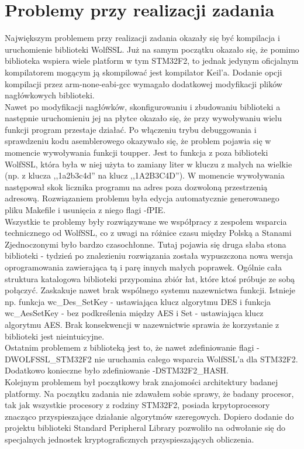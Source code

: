 \documentclass[oneside]{mgr}
\begin{document}
\chapter{Problemy przy realizacji zadania}

Największym problemem przy realizacji zadania okazały się być kompilacja i uruchomienie biblioteki WolfSSL. Już na samym początku okazało się, że pomimo biblioteka wspiera wiele platform w tym STM32F2, to jednak jedynym oficjalnym kompilatorem mogącym ją skompilować jest kompilator Keil'a. Dodanie opcji kompilacji przez arm-none-eabi-gcc wymagało dodatkowej modyfikacji plików nagłówkowych  biblioteki.\\Nawet po modyfikacji nagłówków, skonfigurowaniu i zbudowaniu biblioteki a następnie uruchomieniu jej na płytce okazało się, że przy wywoływaniu wielu funkcji program przestaje działać. Po włączeniu trybu debuggowania i sprawdzeniu kodu asemblerowego okazywało się, że problem pojawia się w momencie wywoływania funkcji toupper. Jest to funkcja z poza biblioteki WolfSSL, która była w niej użyta to zamiany liter w kluczu z małych na wielkie (np. z klucza ,,1a2b3c4d'' na klucz ,,1A2B3C4D''). W momencie wywoływania następował skok licznika programu na adres poza dozwoloną przestrzenią adresową. Rozwiązaniem problemu była edycja automatycznie generowanego pliku Makefile i usunięcia z niego flagi -fPIE.\\
Wszystkie te problemy były rozwiązywane we współpracy z zespołem wsparcia technicznego od WolfSSL, co z uwagi na różnice czasu między Polską a Stanami Zjednoczonymi było bardzo czasochłonne. Tutaj pojawia się druga słaba stona biblioteki - tydzień po znalezieniu rozwiązania została wypuszczona nowa wersja oprogramowania zawierająca tą i parę innych małych poprawek. Ogólnie cała struktura katalogowa biblioteki przypomina zbiór łat, które ktoś próbuje ze sobą połączyć. Zaskakuje nawet brak wspólnego systemu nazewnictwa funkcji. Istnieje np. funkcja wc\_Des\_SetKey - ustawiająca klucz algorytmu DES i funkcja wc\_AesSetKey - bez podkreślenia między AES i Set - ustawiająca klucz algorytmu AES. Brak konsekwencji w nazewnictwie sprawia że korzystanie z biblioteki jest nieintuicyjne.\\
Ostatnim problemem z biblioteką jest to, że nawet zdefiniowanie flagi -DWOLFSSL\_STM32F2 nie uruchamia całego wsparcia WolfSSL'a dla STM32F2. Dodatkowo konieczne było zdefiniowanie -DSTM32F2\_HASH.\\
Kolejnym problemem był początkowy brak znajomości architektury badanej platformy. Na początku zadania nie zdawałem sobie sprawy, że badany procesor, tak jak wszystkie procesory z rodziny STM32F2, posiada krpytoprocesory znacząco przyspieszające działanie algorytmów szeregowych. Dopiero dodanie do projektu biblioteki Standard Peripheral Library pozwoliło na odwołanie się do specjalnych jednostek kryptograficznych przyspieszających obliczenia.
\end{document}
